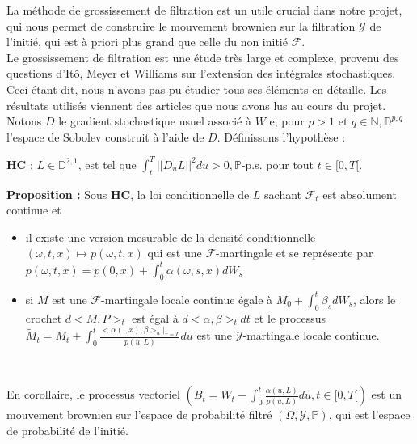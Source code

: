 \documentclass[../finalreport.tex]{subfiles}
\begin{document}
La méthode de grossissement de filtration est un utile crucial dans notre projet, qui nous permet de construire le mouvement brownien sur la filtration $\mathcal{Y}$ de l'initié, qui est à priori plus grand que celle du non initié $\mathcal{F}$.\\

Le grossissement de filtration est une étude très large et complexe, provenu des questions d'Itô, Meyer et Williams sur l'extension des intégrales stochastiques. Ceci étant dit, nous n'avons pas pu étudier tous ses éléments en détaille. Les résultats utilisés viennent des articles que nous avons lus au cours du projet.\\

Notons $D$ le gradient stochastique usuel associé à $W$ e, pour $p > 1$ et $q \in \mathbb{N}, \mathbb{D}^{p,q}$ l'espace de Sobolev construit à l'aide de $D$. Définissons l'hypothèse : 
\begin{center}
\textbf{HC} : $L \in \mathbb{D}^{2,1}$, est tel que $\displaystyle \int_{t}^{T} || D_u L||^2 du >0, \mathbb{P}$-p.s. pour tout $t \in [0,T[$.
\end{center}

\textbf{Proposition : } Sous \textbf{HC}, la loi conditionnelle de $L$ sachant $\mathcal{F}_t$ est absolument continue et \\

\begin{itemize}
\item il existe une version mesurable de la densité conditionnelle $(\omega, t, x) \mapsto p(\omega, t, x)$ qui est une $\mathcal{F}$-martingale et se représente par $ p(\omega, t, x) = p(0, x) + \int_{0}^{t}\alpha(\omega, s, x) dW_s$\
\item si $M$ est une $\mathcal{F}$-martingale locale continue égale à $ M_0 + \int_{0}^{t} \beta_s dW_s$, alors le crochet $d<M,P>_t$ est égal à $d<\alpha, \beta>_t dt$ et le processus $\tilde{M}_t = M_t + \int_{0}^{t}\frac{<\alpha(.,x),\beta>_u |_{x=L}}{p(u, L)} du$ est une $\mathcal{Y}$-martingale locale continue.
\end{itemize}
\

En corollaire, le processus vectoriel $(B_t = W_t - \int_{0}^{t} \frac{\alpha(u, L)}{p(u, L)}du, t \in [0, T[)$ est un mouvement brownien sur l'espace de probabilité filtré $(\Omega, \mathcal{Y}, \mathbb{P})$, qui est l'espace de probabilité de l'initié. \\
\end{document}
